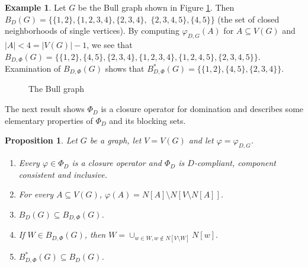 \documentclass{article}
\numberwithin{figure}{section}
\numberwithin{table}{section}
\numberwithin{equation}{section}
\newtheorem{prop}[thm]{Proposition}
\theoremstyle{definition}
\theoremstyle{definition}
\theoremstyle{definition}
\newtheorem{ex}[thm]{Example}
\newcommand{\ben}{\begin{enumerate}}
\newcommand{\een}{\end{enumerate}}
\begin{document}
{ \begin{ex}
    Let $G$ be the Bull graph shown in Figure \ref{f:bull}. 
   Then $ B_{D}(G)=\{\{1,2\},\{1,2,3,4\},\{2,3,4\},$ $\{2,3,4,5\},\{4,5\}\}$ (the set of closed neighborhoods of single vertices).  
    By computing $\varphi_{D,G}(A)$ for  $A\subseteq  V(G)$ and $|A|< 4=|V(G)|-1$, we see that $ B_{D,\Phi}(G)=\{\{1,2\},\{4,5\},\{2,3,4\}, \{1,2,3,4\},\{1,2,4,5\},\{2,3,4,5\}\}$. 
    Examination of $ B_{D,\Phi}(G)$ shows that $ B^*_{D,\Phi}(G)=\{\{1,2\},\{4,5\},\{2,3,4\}\}$.
\begin{figure}[h!]
\centering
{}

\caption{\label{f:bull} The Bull graph}
\end{figure}\end{ex}  

The next result shows $\Phi_D$ is a  closure operator for domination and describes some elementary properties of $\Phi_D$  and its blocking sets.
 \begin{prop} 
 Let $G$ be a graph, let $V=V(G)$ and let $\varphi=\varphi_{D,G}$. 
 \ben[$(1)$]
 \item\label{dom-bas-1} Every $\varphi \in \Phi_D$ is a closure operator and $\Phi_D$ is $D$-compliant, component consistent   and inclusive.

\item\label{dom-bas-2}  For every  $A\subseteq V(G)$, $\varphi(A)= N[A]  \setminus N[V\setminus N[A]]$. 
 
\item \label{dom-bas-3} 
 $ B_D(G) \subseteq B_{D,\Phi}(G)$. 

 \item \label{dom-bas-4} 
If $W\in B_{D,\Phi}(G)$, then $
W=\cup_{w\in W, w\not\in N[V\setminus W]}N[w].$

 \item \label{dom-bas-5} 
 $B_{D,\Phi}^*(G) \subseteq B_D(G) $. 
 \een
\end{prop}

}
\end{document}
